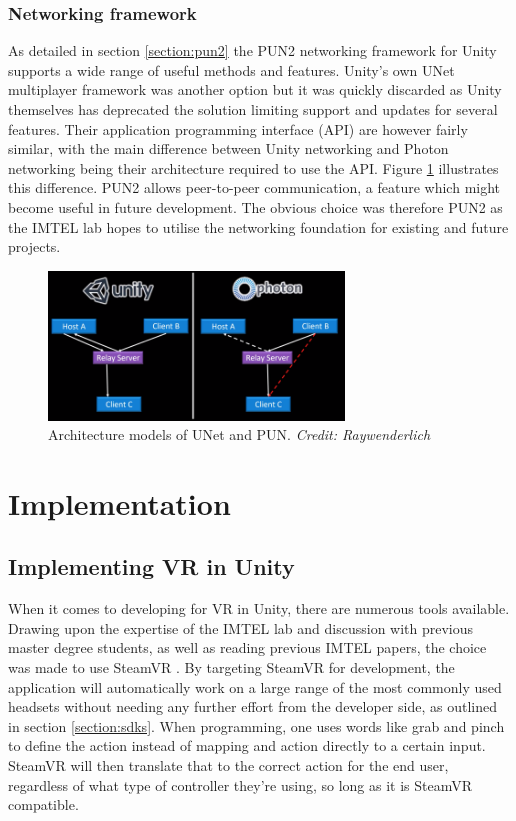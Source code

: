 \subsubsection{Networking framework}
As detailed in section \ref{section:pun2} the PUN2 networking framework for Unity supports a wide range of useful methods and features. Unity's own UNet multiplayer framework  was another option but it was quickly discarded as Unity themselves has deprecated the solution limiting support and updates for several features. Their application programming interface (API) are however fairly similar, with the main difference between Unity networking and Photon networking being their architecture required to use the API. Figure \ref{fig:phase1_unetVSpun} illustrates this difference. PUN2 allows peer-to-peer communication, a feature which might become useful in future development.  
The obvious choice was therefore PUN2 as the IMTEL lab hopes to utilise the networking foundation for existing and future projects.   

\begin{figure}[]
  \centering
    \captionsetup{width=.7\linewidth}
    \includegraphics[width=0.7\textwidth]{fig/phase_1/punVSunet.png}
 \caption{Architecture models of UNet and PUN. \textit{Credit: Raywenderlich}}
\label{fig:phase1_unetVSpun}
\end{figure}



\section{Implementation}

\subsection{Implementing VR in Unity}
When it comes to developing for VR in Unity, there are numerous tools available. Drawing upon the expertise of the IMTEL lab and discussion with previous master degree students, as well as reading previous IMTEL papers, the choice was made to use SteamVR \cite{steamVR}\cite{steamVRAPI}. By targeting SteamVR for development, the application will automatically work on a large range of the most commonly used headsets without needing any further effort from the developer side, as outlined in section \ref{section:sdks}. When programming, one uses words like grab and pinch to define the action instead of mapping and action directly to a certain input. SteamVR will then translate that to the correct action for the end user, regardless of what type of controller they're using, so long as it is SteamVR compatible.

